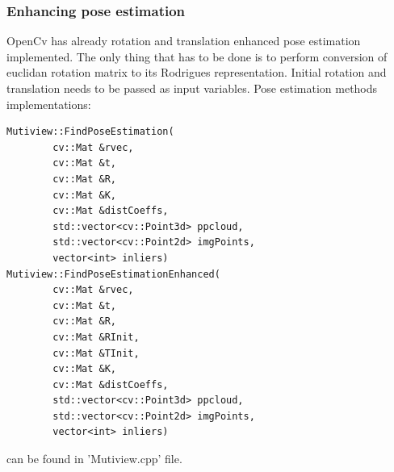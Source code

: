 \subsubsection{Enhancing pose estimation}
OpenCv has already rotation and translation enhanced pose estimation implemented. The only thing that has to be done is to perform conversion of euclidan rotation matrix to its Rodrigues representation. Initial rotation and translation needs to be passed as input variables. Pose estimation methods implementations: 
\begin{lstlisting}
Mutiview::FindPoseEstimation(
        cv::Mat &rvec,
        cv::Mat &t,
        cv::Mat &R,
        cv::Mat &K,
        cv::Mat &distCoeffs,
        std::vector<cv::Point3d> ppcloud,
        std::vector<cv::Point2d> imgPoints,
        vector<int> inliers) 
Mutiview::FindPoseEstimationEnhanced(
        cv::Mat &rvec,
        cv::Mat &t,
        cv::Mat &R,
        cv::Mat &RInit,
        cv::Mat &TInit,
        cv::Mat &K,
        cv::Mat &distCoeffs,
        std::vector<cv::Point3d> ppcloud,
        std::vector<cv::Point2d> imgPoints,
        vector<int> inliers)
\end{lstlisting}
can be found in 'Mutiview.cpp' file.



